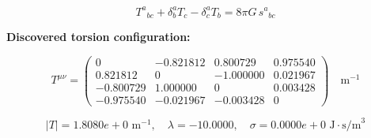 
\begin{equation}
  T^a{}_{bc} + \delta^a_b T_c - \delta^a_c T_b = 8\pi G \, s^a{}_{bc}
\end{equation}

\textbf{Discovered torsion configuration:}

\begin{equation}
  T^{\mu\nu} = \begin{pmatrix}
    0 & -0.821812 & 0.800729 & 0.975540 \\
    0.821812 & 0 & -1.000000 & 0.021967 \\
    -0.800729 & 1.000000 & 0 & 0.003428 \\
    -0.975540 & -0.021967 & -0.003428 & 0
  \end{pmatrix} \quad \text{m}^{-1}
\end{equation}

\begin{equation}
  |T| = 1.8080e+0 \text{ m}^{-1}, \quad
  \lambda = -10.0000, \quad
  \sigma = 0.0000e+0 \text{ J}\cdot\text{s/m}^3
\end{equation}